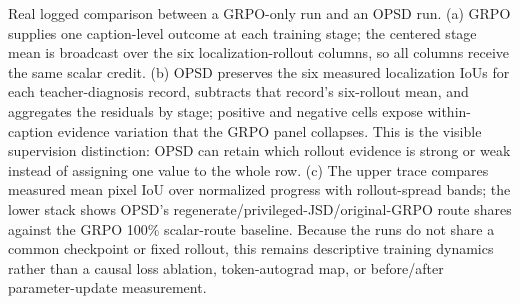 \caption{Real logged comparison between a GRPO-only run and an OPSD run. (a) GRPO supplies one caption-level outcome at each training stage; the centered stage mean is broadcast over the six localization-rollout columns, so all columns receive the same scalar credit. (b) OPSD preserves the six measured localization IoUs for each teacher-diagnosis record, subtracts that record's six-rollout mean, and aggregates the residuals by stage; positive and negative cells expose within-caption evidence variation that the GRPO panel collapses. This is the visible supervision distinction: OPSD can retain which rollout evidence is strong or weak instead of assigning one value to the whole row. (c) The upper trace compares measured mean pixel IoU over normalized progress with rollout-spread bands; the lower stack shows OPSD's regenerate/privileged-JSD/original-GRPO route shares against the GRPO 100\% scalar-route baseline. Because the runs do not share a common checkpoint or fixed rollout, this remains descriptive training dynamics rather than a causal loss ablation, token-autograd map, or before/after parameter-update measurement.}
